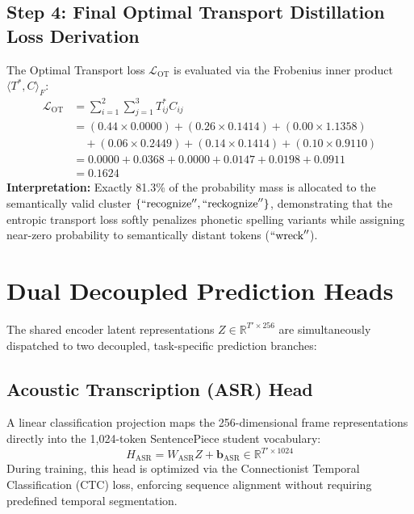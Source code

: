 \subsection{Step 4: Final Optimal Transport Distillation Loss Derivation}
The Optimal Transport loss $\mathcal{L}_{\text{OT}}$ is evaluated via the Frobenius inner product $\langle T^*, C \rangle_F$:
\begin{align}
    \mathcal{L}_{\text{OT}} &= \sum_{i=1}^2 \sum_{j=1}^3 T^*_{ij} C_{ij} \nonumber \\
    &= (0.44 \times 0.0000) + (0.26 \times 0.1414) + (0.00 \times 1.1358) \nonumber \\
    &\quad + (0.06 \times 0.2449) + (0.14 \times 0.1414) + (0.10 \times 0.9110) \nonumber \\
    &= 0.0000 + 0.0368 + 0.0000 + 0.0147 + 0.0198 + 0.0911 \nonumber \\
    &= \mathbf{0.1624}
\end{align}
\textbf{Interpretation:} Exactly 81.3\% of the probability mass is allocated to the semantically valid cluster $\{``\text{recognize}'', ``\text{reckognize}''\}$, demonstrating that the entropic transport loss softly penalizes phonetic spelling variants while assigning near-zero probability to semantically distant tokens ($``\text{wreck}''$).

\section{Dual Decoupled Prediction Heads}
The shared encoder latent representations $Z \in \mathbb{R}^{T' \times 256}$ are simultaneously dispatched to two decoupled, task-specific prediction branches:

\subsection{Acoustic Transcription (ASR) Head}
A linear classification projection maps the 256-dimensional frame representations directly into the 1,024-token SentencePiece student vocabulary:
\begin{equation}
    H_{\text{ASR}} = W_{\text{ASR}} Z + \mathbf{b}_{\text{ASR}} \in \mathbb{R}^{T' \times 1024}
\end{equation}
During training, this head is optimized via the Connectionist Temporal Classification (CTC) loss, enforcing sequence alignment without requiring predefined temporal segmentation.

